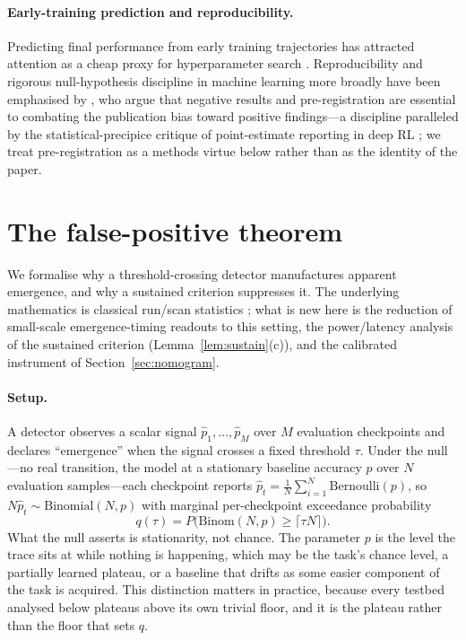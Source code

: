 \documentclass[11pt]{article}
\theoremstyle{plain}
\theoremstyle{definition}
\begin{document}
\paragraph{Early-training prediction and reproducibility.}
Predicting final performance from early training trajectories has attracted attention
as a cheap proxy for hyperparameter search \citep{notsawo2023predicting,xu2026earlywarning}.
Reproducibility and rigorous null-hypothesis discipline in machine learning more broadly
have been emphasised by \citet{pineau2021reproducibility}, who argue that negative
results and pre-registration are essential to combating the publication bias toward
positive findings---a discipline paralleled by the statistical-precipice critique of
point-estimate reporting in deep RL \citep{agarwal2021precipice}; we treat pre-registration as a methods virtue below rather than as the
identity of the paper.

\section{The false-positive theorem}\label{sec:theorem}

We formalise why a threshold-crossing detector manufactures apparent emergence, and why a
sustained criterion suppresses it. The underlying mathematics is classical run/scan
statistics \citep{feller1968,fulou2003runs,glaz2001scan}; what is new here is the reduction
of small-scale emergence-timing readouts to this setting, the power/latency analysis of the
sustained criterion (Lemma~\ref{lem:sustain}(c)), and the calibrated instrument of
Section~\ref{sec:nomogram}.

\paragraph{Setup.}
A detector observes a scalar signal $\hat p_1,\dots,\hat p_M$ over $M$ evaluation
checkpoints and declares ``emergence'' when the signal crosses a fixed threshold $\tau$.
Under the null---no real transition, the model at a stationary baseline accuracy $p$ over
$N$ evaluation
samples---each checkpoint reports $\hat p_t = \tfrac1N\sum_{i=1}^N\mathrm{Bernoulli}(p)$,
so $N\hat p_t\sim\mathrm{Binomial}(N,p)$ with marginal per-checkpoint exceedance
probability
\[
  q(\tau) = P\!\bigl(\mathrm{Binom}(N,p) \geq \lceil \tau N\rceil\bigr).
\]
What the null asserts is stationarity, not chance. The parameter $p$ is the level the
trace sits at while nothing is happening, which may be the task's chance level, a
partially learned plateau, or a baseline that drifts as some easier component of the task
is acquired. This distinction matters in practice, because every testbed analysed below
plateaus above its own trivial floor, and it is the plateau rather than the floor that
sets $q$.
\end{document}
